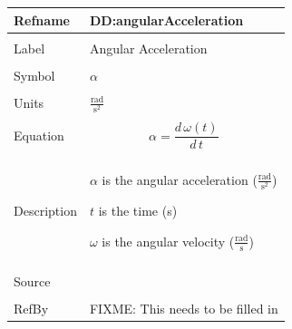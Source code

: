 \documentclass[12pt]{article}
\begin{document}
\noindent \begin{minipage}{\textwidth}
\begin{tabular}{p{} p{}}
\toprule \textbf{Refname} & \textbf{DD:angularAcceleration}
\label{DD:angularAcceleration}
\\ \midrule \\
Label & Angular Acceleration
\\ \midrule \\
Symbol & $α$
\\ \midrule \\
Units & $\frac{\text{rad}}{\text{s}^{2}}$
\\ \midrule \\
Equation & \begin{dmath}
           α=\frac{d\,ω\left(t\right)}{d\,t}
           \end{dmath}
\\ \midrule \\
Description & \begin{symbDescription}
              \item{$α$ is the angular acceleration ($\frac{\text{rad}}{\text{s}^{2}}$)}
              \item{$t$ is the time (s)}
              \item{$ω$ is the angular velocity ($\frac{\text{rad}}{\text{s}}$)}
              \end{symbDescription}
\\ \midrule \\
Source & 
\\ \midrule \\
RefBy & FIXME: This needs to be filled in
\\ \bottomrule \end{tabular}
\end{minipage}\\
~\newline
\end{document}
